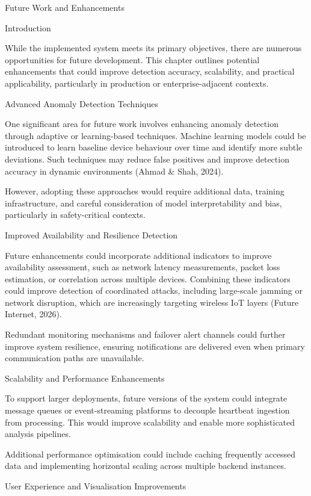 Future Work and Enhancements

Introduction

While the implemented system meets its primary objectives, there are numerous opportunities for future development. This chapter outlines potential enhancements that could improve detection accuracy, scalability, and practical applicability, particularly in production or enterprise-adjacent contexts.

Advanced Anomaly Detection Techniques

One significant area for future work involves enhancing anomaly detection through adaptive or learning-based techniques. Machine learning models could be introduced to learn baseline device behaviour over time and identify more subtle deviations. Such techniques may reduce false positives and improve detection accuracy in dynamic environments (Ahmad \& Shah, 2024).

However, adopting these approaches would require additional data, training infrastructure, and careful consideration of model interpretability and bias, particularly in safety-critical contexts.

Improved Availability and Resilience Detection

Future enhancements could incorporate additional indicators to improve availability assessment, such as network latency measurements, packet loss estimation, or correlation across multiple devices. Combining these indicators could improve detection of coordinated attacks, including large-scale jamming or network disruption, which are increasingly targeting wireless IoT layers (Future Internet, 2026).

Redundant monitoring mechanisms and failover alert channels could further improve system resilience, ensuring notifications are delivered even when primary communication paths are unavailable.

Scalability and Performance Enhancements

To support larger deployments, future versions of the system could integrate message queues or event-streaming platforms to decouple heartbeat ingestion from processing. This would improve scalability and enable more sophisticated analysis pipelines.

Additional performance optimisation could include caching frequently accessed data and implementing horizontal scaling across multiple backend instances.

User Experience and Visualisation Improvements

